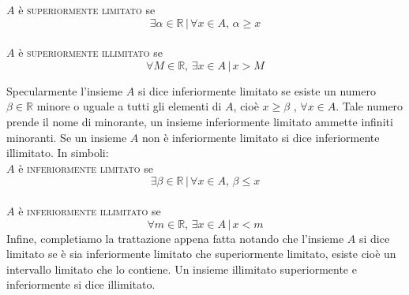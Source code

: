 $A$ è \textsc{superiormente limitato} se 
\begin{equation}
  \exists \alpha\in\mathbb{R}\, \vert\, \forall x \in A,\,\alpha\geq x
\end{equation}
\\

$A$ è \textsc{superiormente illimitato} se 
\begin{equation}
  \forall M\in\mathbb{R},\, \exists x \in A\, \vert\,x> M
\end{equation}

Specularmente l'insieme $A$ si dice inferiormente limitato se esiste un 
numero $\beta\in \mathbb{R}$ minore o uguale a tutti gli elementi di $A$, 
cioè $x\geq\beta$ , $\forall x\in A$. Tale numero prende il nome di 
minorante, un insieme inferiormente limitato ammette infiniti minoranti. Se 
un insieme $A$ non è inferiormente limitato si dice inferiormente illimitato.
In simboli:\\

$A$ è \textsc{inferiormente limitato} se 
\begin{equation}
  \exists \beta\in\mathbb{R}\, \vert\, \forall x \in A,\,\beta\leq x
\end{equation}
\\

$A$ è \textsc{inferiormente illimitato} se 
\begin{equation}
  \forall m\in\mathbb{R},\, \exists x \in A\, \vert\,x< m
\end{equation}
Infine, completiamo la trattazione appena fatta notando che l'insieme $A$ si 
dice limitato se è sia inferiormente limitato che superiormente limitato, 
esiste cioè un intervallo limitato che lo contiene. Un insieme illimitato 
superiormente e inferiormente si dice illimitato.\\

